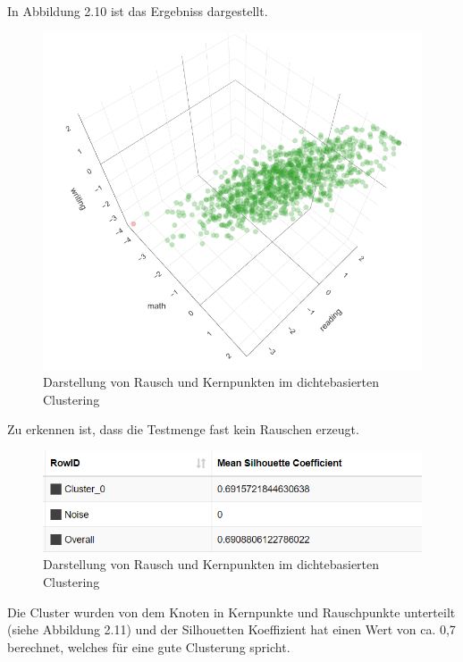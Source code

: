 \documentclass[12pt,					%
							 oneside,			%
							 a4paper,			%
							 halfparskip,		%
							 liststotoc,			%
							 bibtotoc,			%
							 fleqn,				%
							 pointlessnumbers]	%
							 {scrreprt}
\begin{document}
		In Abbildung 2.10 ist das Ergebniss dargestellt. 
		
		\begin{figure}[!h]
			\begin{center}
				\includegraphics[scale=0.5]{pictures/plotly_dense.png}
				\caption{Darstellung von Rausch und Kernpunkten im dichtebasierten Clustering}
			\end{center}
		\end{figure}
		
		Zu erkennen ist, dass die Testmenge fast kein Rauschen erzeugt. 
		
		\begin{figure}[!h]
			\begin{center}
				\includegraphics[scale=0.7]{pictures/sil_dens.png}
				\caption{Darstellung von Rausch und Kernpunkten im dichtebasierten Clustering}
			\end{center}
		\end{figure}
		
		Die Cluster wurden von dem Knoten in Kernpunkte und Rauschpunkte unterteilt (siehe Abbildung 2.11) und der Silhouetten Koeffizient hat einen Wert von ca. 0,7 berechnet, welches für eine gute Clusterung spricht. 
		\newpage
\end{document}

